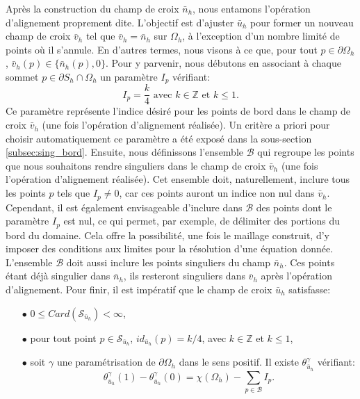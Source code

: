 Après la construction du champ de croix $\bar{n}_h$, nous entamons l'opération d'alignement proprement dite. L'objectif est d'ajuster $\bar{u}_h$ pour former un nouveau champ de croix $\bar{v}_h$ tel que $\bar{v}_h=\bar{n}_h$ sur $\Omega_h$, à l'exception d'un nombre limité de points où il s'annule. En d'autres termes, nous visons à ce que, pour tout $p\in\partial\Omega_h$, $\bar{v}_h(p)\in\{\bar{n}_h(p), 0\}$. Pour y parvenir, nous débutons en associant à chaque sommet $p\in\partial S_h\cap\Omega_h$ un paramètre $I_p$ vérifiant:
\begin{equation}
I_p=\displaystyle\frac{k}{4}\mbox{ avec }k\in\mathbb{Z}\mbox{ et }k\leq 1.
\end{equation}
Ce paramètre représente l'indice désiré pour les points de bord dans le champ de croix $\bar{v}_h$ (une fois l'opération d'alignement réalisée). Un critère a priori pour choisir automatiquement ce paramètre a été exposé dans la sous-section \ref{subsec:sing_bord}. Ensuite, nous définissons l'ensemble $\mathcal{B}$ qui regroupe les points que nous souhaitons rendre singuliers dans le champ de croix $\bar{v}_h$ (une fois l'opération d'alignement réalisée). Cet ensemble doit, naturellement, inclure tous les points $p$ tels que $I_p\neq 0$, car ces points auront un indice non nul dans $\bar{v}_h$. Cependant, il est également envisageable d'inclure dans $\mathcal{B}$ des points dont le paramètre $I_p$ est nul, ce qui permet, par exemple, de délimiter des portions du bord du domaine. Cela offre la possibilité, une fois le maillage construit, d'y imposer des conditions aux limites pour la résolution d'une équation donnée. L'ensemble $\mathcal{B}$ doit aussi inclure les points singuliers du champ $\bar{n}_h$. Ces points étant déjà singulier dans $\bar{n}_h$, ils resteront singuliers dans $\bar{v}_h$ après l'opération d'alignement. Pour finir, il est impératif que le champ de croix $\bar{u}_h$ satisfasse:\\
\begin{itemize}
 \item[$\bullet$] $0\leq Card(\mathcal{S}_{\bar{u}_h})<\infty$,\\
 \item[$\bullet$] pour tout point $p\in\mathcal{S}_{\bar{u}_h}$, $id_{\bar{u}_h}(p)=k/4$, avec $k\in\mathbb{Z}$ et $k\leq 1$,\\
 \item[$\bullet$] soit $\gamma$ une paramétrisation de $\partial\Omega_h$ dans le sens positif. Il existe $\theta_{\bar{u}_h}^\gamma$ vérifiant:
 \begin{equation}
    \label{eqn:etude_hyp_u_simple}
    \theta_{\bar{u}_h}^\gamma(1)-\theta_{\bar{u}_h}^\gamma(0)=\chi(\Omega_h)-\sum_{p\in\mathcal{B}}I_p.
\end{equation}
\end{itemize}
